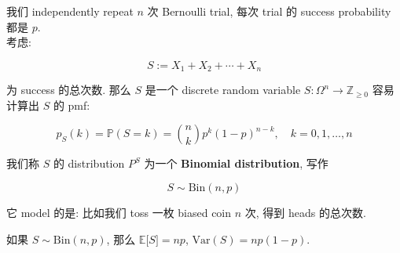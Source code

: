 \begin{example}

我们 independently repeat \(\mathit{n}\) 次 Bernoulli trial, 每次 trial 的 success probability 都是 \(\mathit{p}\).\\
考虑:

\[\mathit{S} := \mathit{X}_{1} + \mathit{X}_{2} + \cdots + \mathit{X}_{\mathit{n}}\]

为 success 的总次数. 那么 \(\mathit{S}\) 是一个 discrete random variable \(\mathit{S}:\Omega^{\mathit{n}}\rightarrow\mathbb{Z}_{\geq 0}\) 容易计算出 \(\mathit{S}\) 的 pmf:

\[\mathit{p}_{\mathit{S}}(\mathit{k}) = \mathbb{P}(\mathit{S} = \mathit{k}) = \binom{\mathit{n}}{\mathit{k}}\mathit{p}^{\mathit{k}}(1 - \mathit{p})^{\mathit{n} - \mathit{k}},\quad\mathit{k} = 0,1,\ldots,\mathit{n}\]

我们称 \(\mathit{S}\) 的 distribution \(\mathit{P}^{\mathit{S}}\) 为一个 \textbf{Binomial distribution}, 写作

\[\mathit{S} \sim \text{Bin}(\mathit{n},\mathit{p})\]

它 model 的是: 比如我们 toss 一枚 biased coin \(\mathit{n}\) 次, 得到 heads 的总次数.\\

\end{example}

\begin{proposition}

如果 \(\mathit{S} \sim \text{Bin}(\mathit{n},\mathit{p})\), 那么 \(\mathbb{E}\lbrack\mathit{S}\rbrack = \mathit{n}\mathit{p}\), \(\text{Var}(\mathit{S}) = \mathit{n}\mathit{p}(1 - \mathit{p})\).

\end{proposition}

